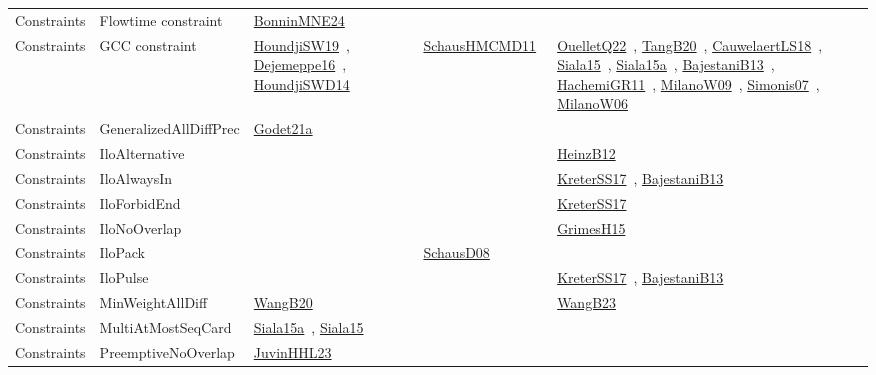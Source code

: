 {\begin{longtable}{lp{3cm}>{\raggedright\arraybackslash}p{6cm}>{\raggedright\arraybackslash}p{6cm}>{\raggedright\arraybackslash}p{8cm}}
Constraints & Flowtime constraint & \href{../works/BonninMNE24.pdf}{BonninMNE24}~\cite{BonninMNE24} &  & \\
Constraints & GCC constraint & \href{../works/HoundjiSW19.pdf}{HoundjiSW19}~\cite{HoundjiSW19}, \href{../works/Dejemeppe16.pdf}{Dejemeppe16}~\cite{Dejemeppe16}, \href{../works/HoundjiSWD14.pdf}{HoundjiSWD14}~\cite{HoundjiSWD14} & \href{../works/SchausHMCMD11.pdf}{SchausHMCMD11}~\cite{SchausHMCMD11} & \href{../works/OuelletQ22.pdf}{OuelletQ22}~\cite{OuelletQ22}, \href{../works/TangB20.pdf}{TangB20}~\cite{TangB20}, \href{../works/CauwelaertLS18.pdf}{CauwelaertLS18}~\cite{CauwelaertLS18}, \href{../works/Siala15.pdf}{Siala15}~\cite{Siala15}, \href{../works/Siala15a.pdf}{Siala15a}~\cite{Siala15a}, \href{../works/BajestaniB13.pdf}{BajestaniB13}~\cite{BajestaniB13}, \href{../works/HachemiGR11.pdf}{HachemiGR11}~\cite{HachemiGR11}, \href{../works/MilanoW09.pdf}{MilanoW09}~\cite{MilanoW09}, \href{../works/Simonis07.pdf}{Simonis07}~\cite{Simonis07}, \href{../works/MilanoW06.pdf}{MilanoW06}~\cite{MilanoW06}\\
Constraints & GeneralizedAllDiffPrec & \href{../works/Godet21a.pdf}{Godet21a}~\cite{Godet21a} &  & \\
Constraints & IloAlternative &  &  & \href{../works/HeinzB12.pdf}{HeinzB12}~\cite{HeinzB12}\\
Constraints & IloAlwaysIn &  &  & \href{../works/KreterSS17.pdf}{KreterSS17}~\cite{KreterSS17}, \href{../works/BajestaniB13.pdf}{BajestaniB13}~\cite{BajestaniB13}\\
Constraints & IloForbidEnd &  &  & \href{../works/KreterSS17.pdf}{KreterSS17}~\cite{KreterSS17}\\
Constraints & IloNoOverlap &  &  & \href{../works/GrimesH15.pdf}{GrimesH15}~\cite{GrimesH15}\\
Constraints & IloPack &  & \href{../works/SchausD08.pdf}{SchausD08}~\cite{SchausD08} & \\
Constraints & IloPulse &  &  & \href{../works/KreterSS17.pdf}{KreterSS17}~\cite{KreterSS17}, \href{../works/BajestaniB13.pdf}{BajestaniB13}~\cite{BajestaniB13}\\
Constraints & MinWeightAllDiff & \href{../works/WangB20.pdf}{WangB20}~\cite{WangB20} &  & \href{../works/WangB23.pdf}{WangB23}~\cite{WangB23}\\
Constraints & MultiAtMostSeqCard & \href{../works/Siala15a.pdf}{Siala15a}~\cite{Siala15a}, \href{../works/Siala15.pdf}{Siala15}~\cite{Siala15} &  & \\
Constraints & PreemptiveNoOverlap & \href{../works/JuvinHHL23.pdf}{JuvinHHL23}~\cite{JuvinHHL23} &  & \\

\end{longtable}}
